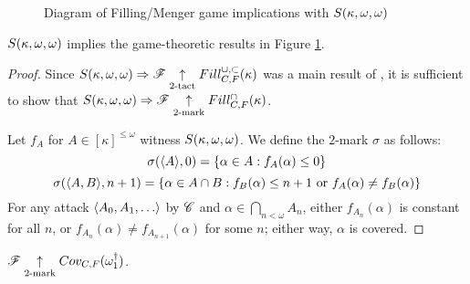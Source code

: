 \begin{figure}[h]
\begin{center}
\end{center}
\caption{Diagram of Filling/Menger game implications with $S(\kappa,\omega,\omega)$}
\label{fillingGamesDiagram2}
\end{figure}

\begin{thm}
  $S(\kappa,\omega,\omega)$ implies the game-theoretic results in
  Figure \ref{fillingGamesDiagram2}.
\end{thm}

\begin{proof}
  Since $S(\kappa,\omega,\omega)\Rightarrow\mathscr{F} \underset{2\text{-tact}}{\uparrow}Fill^{\cup,\subset}_{C,F}(\kappa)$ was
  a main result of \cite{MR1129143}, it is sufficient to show that
  $S(\kappa,\omega,\omega)\Rightarrow \mathscr{F} \underset{2\text{-mark}}{\uparrow}Fill^{\cap}_{C,F}(\kappa)$.

  Let $f_A$ for $A\in[\kappa]^{\leq\omega}$ witness $S(\kappa,\omega,\omega)$. We define
  the $2$-mark $\sigma$ as follows:
    \[
      \sigma(\langle A\rangle,0) = \{\alpha\in A: f_A(\alpha) \leq 0 \}
    \]
    \[
      \sigma(\langle A,B\rangle,n+1)
        =
      \{
        \alpha \in A\cap B
      :
        f_B(\alpha) \leq n+1 \text{ or }
        f_A(\alpha)\not=f_B(\alpha)
      \}
    \]
  For any attack $\<A_0,A_1,\dots\>$ by $\mathscr{C}$ and
  $\alpha\in\bigcap_{n<\omega}A_n$, either $f_{A_n}(\alpha)$ is constant for
  all $n$, or $f_{A_n}(\alpha)\not=f_{A_{n+1}}(\alpha)$ for some $n$;
  either way, $\alpha$ is covered.
\end{proof}

\begin{cor}
  $\mathscr{F} \underset{2\text{-mark}}{\uparrow}Cov_{C,F}(\omega^\dagger_1)$.
\end{cor}



